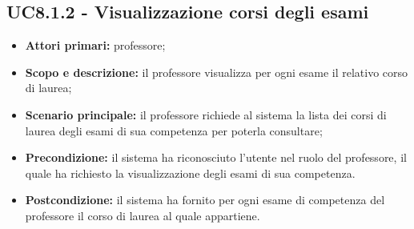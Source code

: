 \documentclass[AnalisiDeiRequisiti.tex]{subfiles}
\begin{document}
\subsection{UC8.1.2 - Visualizzazione corsi degli esami}
\begin{itemize}
	\item \textbf{Attori primari:} professore;
	\item \textbf{Scopo e descrizione:} il professore visualizza per ogni esame il relativo corso di laurea;
	\item \textbf{Scenario principale:} il professore richiede al sistema la lista dei corsi di laurea degli esami di sua competenza per poterla consultare;
	\item \textbf{Precondizione:} il sistema ha riconosciuto l'utente nel ruolo del professore, il quale ha richiesto la visualizzazione degli esami di sua competenza.
	\item \textbf{Postcondizione:} il sistema ha fornito per ogni esame di competenza del professore il corso di laurea al quale appartiene.
\end{itemize}
\end{document}
